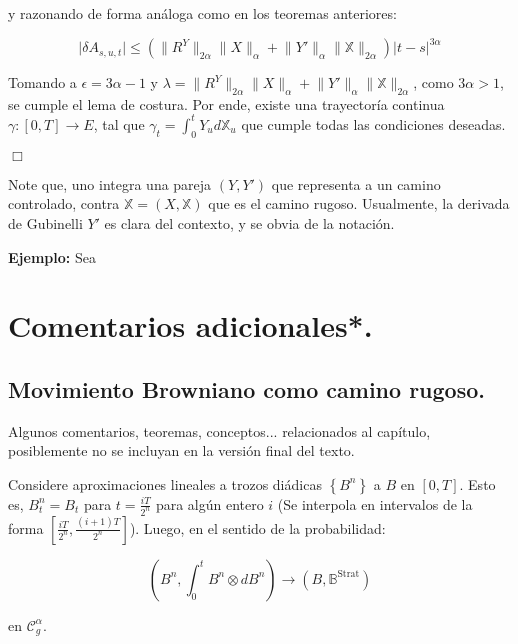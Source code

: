 y razonando de forma análoga como en los teoremas anteriores:

\[
	\lvert \delta A_{s,u,t} \rvert \leq \left(  \lVert R^Y \rVert_{2\alpha} \lVert X \rVert_{\alpha} + \lVert Y' \rVert_{\alpha}  \lVert \mathbb{X} \rVert_{2\alpha} \right) \lvert t - s \rvert^{3\alpha}
\]

Tomando a $\epsilon = 3\alpha - 1$ y $\lambda = \lVert R^Y \rVert_{2\alpha} \lVert X \rVert_{\alpha} + \lVert Y' \rVert_{\alpha}  \lVert \mathbb{X} \rVert_{2\alpha}$, como $3 \alpha > 1$, se cumple el lema de costura. Por ende, existe una trayectoría continua $\gamma: [0,T] \rightarrow E$, tal que $\gamma_t = \int_0^t Y_u d \mathbb{X}_u$ que cumple todas las condiciones deseadas.

\begin{flushright}
	$\Box$
\end{flushright}


Note que, uno integra una pareja $(Y, Y')$ que representa a un camino controlado, contra $\mathbb{X} = (X, \mathbb{X})$ que es el camino rugoso. Usualmente, la derivada de Gubinelli $Y'$ es clara del contexto, y se obvia de la notación.

\textbf{Ejemplo:} Sea 

















\section{Comentarios adicionales*.}

\subsection{Movimiento Browniano como camino rugoso.}

Algunos comentarios, teoremas, conceptos... relacionados al capítulo, posiblemente no se incluyan en la versión final del texto.

\begin{prop}
	Considere aproximaciones lineales a trozos diádicas $\left\{ B^{n} \right\}$ a $B$ en $[0,T]$. Esto es, $B_t^n = B_t$ para $t = \frac{iT}{2^n}$ para algún entero $i$ (Se interpola en intervalos de la forma $\left[ \frac{iT}{2^n}, \frac{(i+1)T}{2^n} \right]$). Luego, en el sentido de la probabilidad:

	\[
		\left( B^n, \int_0^t B^n \otimes dB^n \right) \rightarrow (B, \mathbb{B}^{\text{Strat}})
	\]

	en $\mathcal{C}^{\alpha}_g$.

\end{prop}

